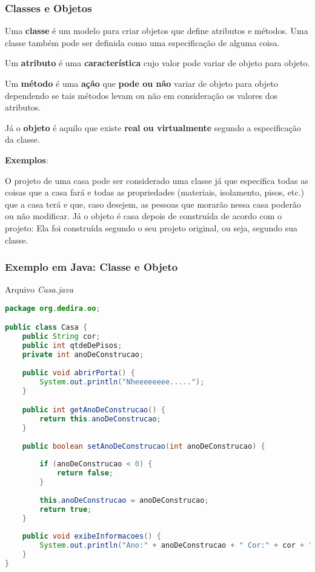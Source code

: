 \begin{frame}
	\frametitle{Classes e Objetos}
	
	\par Uma \textbf{classe} é um modelo para criar objetos que define atributos e métodos. Uma classe também pode ser definida como uma especificação de alguma coisa.
	
	\par Um \textbf{atributo} é uma \textbf{característica} cujo valor pode variar de objeto para objeto.
	
	\par Um \textbf{método} é uma \textbf{ação} que \textbf{pode ou não} variar de objeto para objeto dependendo se tais métodos levam ou não em consideração os valores dos atributos.
	
	\par Já o \textbf{objeto} é aquilo que existe \textbf{real ou virtualmente} segundo a especificação da classe.

	\par \textbf{Exemplos}:
	\par O projeto de uma casa pode ser considerado uma classe já que especifica todas as coisas que a casa fará e todas as propriedades (materiais, isolamento, pisos, etc.) que a casa terá e que, caso desejem, as pessoas que morarão nessa casa poderão ou não modificar. Já o objeto é casa depois de construída de acordo com o projeto: Ela foi construída segundo o seu projeto original, ou seja, segundo sua classe.
\end{frame}

\begin{frame}[fragile]
	\frametitle{Exemplo em Java: Classe e Objeto}
	\par Arquivo \textit{Casa.java}
	\begin{lstlisting}[language=Java]
package org.dedira.oo;

public class Casa {
	public String cor;
	public int qtdeDePisos;
	private int anoDeConstrucao;
	
	public void abrirPorta() {
		System.out.println("Nheeeeeeee.....");
	}

	public int getAnoDeConstrucao() {
		return this.anoDeConstrucao;
	}
	
	public boolean setAnoDeConstrucao(int anoDeConstrucao) {
		
		if (anoDeConstrucao < 0) {
			return false;
		}
		
		this.anoDeConstrucao = anoDeConstrucao;
		return true;
	}
	
	public void exibeInformacoes() {
		System.out.println("Ano:" + anoDeConstrucao + " Cor:" + cor + " Pisos:" + qtdeDePisos);
	}
}
	\end{lstlisting}
\end{frame}

